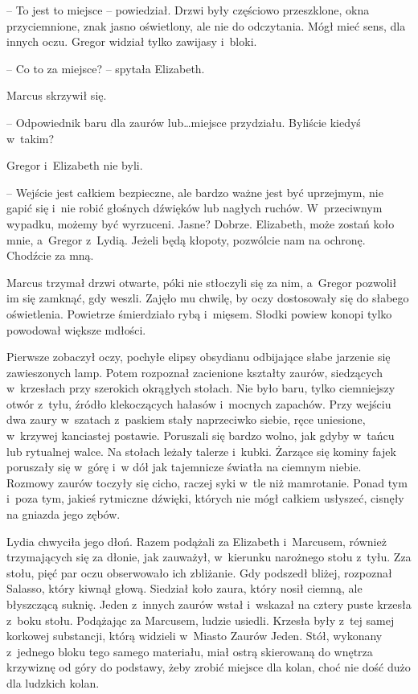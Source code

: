 \documentclass[oneside,polish,12pt,sfheadings]{mwbk}
\begin{document}
-- To jest to miejsce -- powiedział. Drzwi były częściowo przeszklone,
okna przyciemnione, znak jasno oświetlony, ale nie do odczytania. Mógł
mieć sens, dla innych oczu. Gregor widział tylko zawijasy i~bloki.

-- Co to za miejsce? -- spytała Elizabeth.

Marcus skrzywił się. 

-- Odpowiednik baru dla zaurów lub\ldots miejsce
przydziału. Byliście kiedyś w~takim?

Gregor i~Elizabeth nie byli.

-- Wejście jest całkiem bezpieczne, ale bardzo ważne jest być uprzejmym,
nie gapić się i~nie robić głośnych dźwięków lub nagłych ruchów. W~przeciwnym wypadku, możemy być wyrzuceni. Jasne? Dobrze. Elizabeth, może
zostań koło mnie, a~Gregor z~Lydią. Jeżeli będą kłopoty, pozwólcie nam
na ochronę. Chodźcie za mną.

Marcus trzymał drzwi otwarte, póki nie stłoczyli się za nim, a~Gregor
pozwolił im się zamknąć, gdy weszli. Zajęło mu chwilę, by oczy
dostosowały się do słabego oświetlenia. Powietrze śmierdziało rybą i~mięsem. Słodki powiew konopi tylko powodował większe mdłości.

Pierwsze zobaczył oczy, pochyłe elipsy obsydianu odbijające słabe
jarzenie się zawieszonych lamp. Potem rozpoznał zacienione kształty
zaurów, siedzących w~krzesłach przy szerokich okrągłych stołach. Nie
było baru, tylko ciemniejszy otwór z~tyłu, źródło klekoczących hałasów i~mocnych zapachów. Przy wejściu dwa zaury w~szatach z~paskiem stały
naprzeciwko siebie, ręce uniesione, w~krzywej kanciastej postawie.
Poruszali się bardzo wolno, jak gdyby w~tańcu lub rytualnej walce. Na
stołach leżały talerze i~kubki. Żarzące się kominy fajek poruszały się w~górę i~w dół jak tajemnicze światła na ciemnym niebie. Rozmowy zaurów
toczyły się cicho, raczej syki w~tle niż mamrotanie. Ponad tym i~poza
tym, jakieś rytmiczne dźwięki, których nie mógł całkiem usłyszeć,
cisnęły na gniazda jego zębów.

Lydia chwyciła jego dłoń. Razem podążali za Elizabeth i~Marcusem,
również trzymających się za dłonie, jak zauważył, w~kierunku narożnego
stołu z~tyłu. Zza stołu, pięć par oczu obserwowało ich zbliżanie. Gdy
podszedł bliżej, rozpoznał Salasso, który kiwnął głową. Siedział koło
zaura, który nosił ciemną, ale błyszczącą suknię. Jeden z~innych zaurów
wstał i~wskazał na cztery puste krzesła z~boku stołu. Podążając za
Marcusem, ludzie usiedli. Krzesła były z~tej samej korkowej substancji,
którą widzieli w~Miasto Zaurów Jeden. Stół, wykonany z~jednego bloku
tego samego materiału, miał ostrą skierowaną do wnętrza krzywiznę od
góry do podstawy, żeby zrobić miejsce dla kolan, choć nie dość dużo dla
ludzkich kolan.
\end{document}
